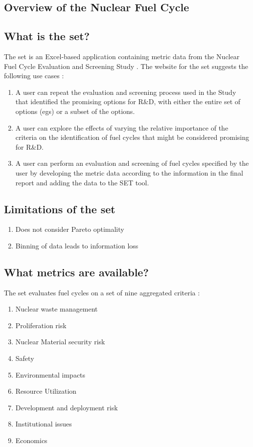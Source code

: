 \subsection{Overview of the Nuclear Fuel Cycle}

\subsection{What is the \ac{set}?}

The \ac{set} is an Excel-based application containing metric data from the Nuclear Fuel Cycle Evaluation and Screening Study
\cite{wigeland_nuclear_2014}. The website for the \ac{set} suggests the following use cases \cite{pincock_screening_2014}:
\begin{enumerate}
    \item A user can repeat the evaluation and screening process used in the Study that identified the promising options for R\&D, with either the entire set of options (\acp{eg}) or a subset of the options.
    \item A user can explore the effects of varying the relative importance of the criteria on the identification of fuel cycles that might be considered promising for R\&D.
    \item A user can perform an evaluation and screening of fuel cycles specified by the user by developing the metric data according to the information in the final report and adding the data to the SET tool.
\end{enumerate}

\subsection{Limitations of the \ac{set}}
\begin{enumerate}
    \item Does not consider Pareto optimality
    \item Binning of data leads to information loss
\end{enumerate}

\subsection{What metrics are available?}

The \ac{set} evaluates fuel cycles on a set of nine aggregated criteria \cite{wigeland_nuclear_2014}:
\begin{enumerate}
    \item Nuclear waste management
    \item Proliferation risk
    \item Nuclear Material security risk
    \item Safety
    \item Environmental impacts
    \item Resource Utilization
    \item Development and deployment risk
    \item Institutional issues
    \item Economics
\end{enumerate}

